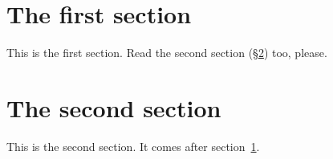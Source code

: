 \documentclass{article}
\begin{document}
\section{The first section}
\label{sec:first}
This is the first section. Read the second section (\S\ref{sec:second}) too, please.

\section{The second section}
\label{sec:second}
This is the second section. It comes after section~\ref{sec:first}.
\end{document}
